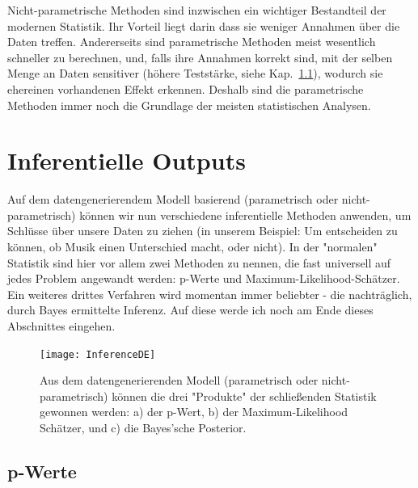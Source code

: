 \documentclass[a4paper,twoside]{tufte-book}\usepackage[]{graphicx}\usepackage[]{color}
\begin{document}
Nicht-parametrische Methoden sind inzwischen ein wichtiger Bestandteil der modernen Statistik. Ihr Vorteil liegt darin dass sie weniger Annahmen über die Daten treffen. Andererseits sind parametrische Methoden meist wesentlich schneller zu berechnen, und, falls ihre Annahmen korrekt sind, mit der selben Menge an Daten sensitiver (höhere Teststärke, siehe Kap.~\ref{ch: p-werte}), wodurch sie ehereinen vorhandenen Effekt erkennen. Deshalb sind die parametrische Methoden immer noch die Grundlage der meisten statistischen Analysen.


\section{Inferentielle Outputs}

Auf dem datengenerierendem Modell basierend (parametrisch oder nicht-parametrisch) können wir nun verschiedene inferentielle Methoden anwenden, um Schlüsse über unsere Daten zu ziehen (in unserem Beispiel: Um entscheiden zu können, ob Musik einen Unterschied macht, oder nicht). In der "normalen" Statistik sind hier vor allem zwei Methoden zu nennen, die fast universell auf jedes Problem angewandt werden: p-Werte und Maximum-Likelihood-Schätzer. Ein weiteres drittes Verfahren wird momentan immer beliebter - die nachträglich, durch Bayes ermittelte Inferenz. Auf diese werde ich noch am Ende dieses Abschnittes eingehen.

\begin{figure}[htb]
\begin{center}
\texttt{[image: InferenceDE]}
\caption{Aus dem datengenerierenden Modell (parametrisch oder nicht-parametrisch) können die drei "Produkte" der schließenden Statistik gewonnen werden: a) der p-Wert, b) der Maximum-Likelihood Schätzer, und c) die Bayes'sche Posterior.}
\label{fig: InferenceMethods}
\end{center}
\end{figure}


\subsection{p-Werte}\label{ch: p-werte}
\end{document}
